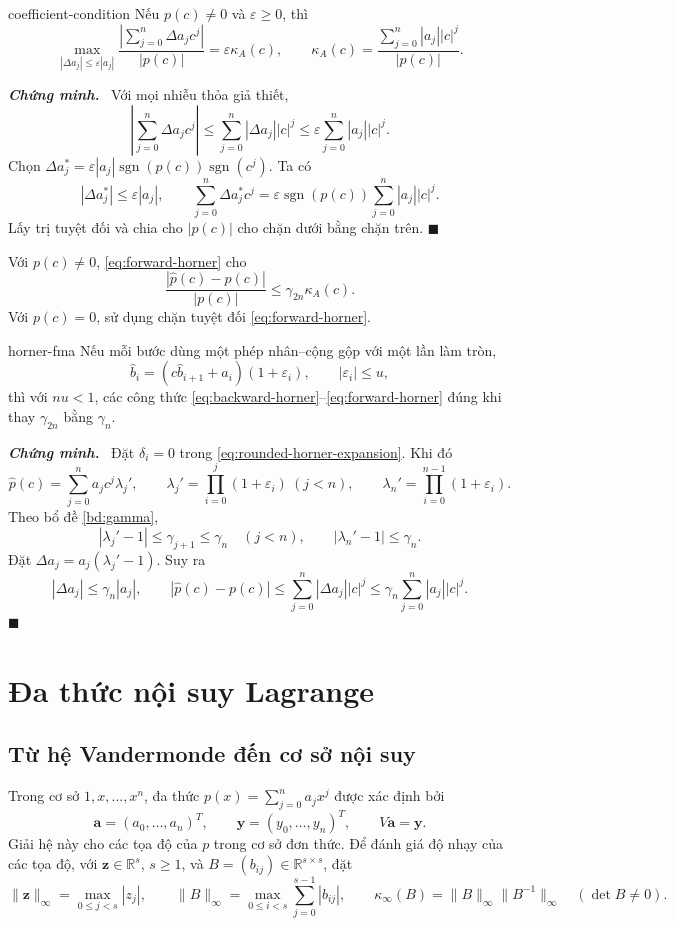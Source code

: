 \documentclass[12pt,a4paper,oneside]{book}
\numberwithin{algorithm}{chapter}
\theoremstyle{definition}
\newenvironment{chungminh}{\par\medskip\noindent\textbf{\textit{\color{mainblue}Chứng minh.}}\ }{\hfill$\blacksquare$\par\medskip}
\newcommand{\R}{\mathbb{R}}
\begin{document}
\begin{menhde}{}{coefficient-condition}
Nếu $p(c)\ne0$ và $\varepsilon\geq0$, thì
\[
 \max_{|\Delta a_j|\leq\varepsilon|a_j|}
 \frac{\left|\sum_{j=0}^{n}\Delta a_jc^j\right|}{|p(c)|}
 =\varepsilon\kappa_A(c),\qquad
 \kappa_A(c)=\frac{\sum_{j=0}^{n}|a_j||c|^j}{|p(c)|}.
\]
\end{menhde}
\begin{chungminh}
Với mọi nhiễu thỏa giả thiết,
\[
 \left|\sum_{j=0}^{n}\Delta a_jc^j\right|
 \leq\sum_{j=0}^{n}|\Delta a_j||c|^j
 \leq\varepsilon\sum_{j=0}^{n}|a_j||c|^j.
\]
Chọn $\Delta a_j^*=\varepsilon|a_j|\operatorname{sgn}(p(c))\operatorname{sgn}(c^j)$. Ta có
\[
 |\Delta a_j^*|\leq\varepsilon|a_j|,\qquad
 \sum_{j=0}^{n}\Delta a_j^*c^j
 =\varepsilon\operatorname{sgn}(p(c))\sum_{j=0}^{n}|a_j||c|^j.
\]
Lấy trị tuyệt đối và chia cho $|p(c)|$ cho chặn dưới bằng chặn trên.
\end{chungminh}

Với $p(c)\ne0$, \eqref{eq:forward-horner} cho
\[
 \frac{|\widehat p(c)-p(c)|}{|p(c)|}\leq\gamma_{2n}\kappa_A(c).
\]
Với $p(c)=0$, sử dụng chặn tuyệt đối \eqref{eq:forward-horner}.

\begin{hequa}{}{horner-fma}
Nếu mỗi bước dùng một phép nhân--cộng gộp với một lần làm tròn,
\[
 \widehat b_i=(c\widehat b_{i+1}+a_i)(1+\varepsilon_i),\qquad
 |\varepsilon_i|\leq u,
\]
thì với $nu<1$, các công thức \eqref{eq:backward-horner}--\eqref{eq:forward-horner} đúng khi thay $\gamma_{2n}$ bằng $\gamma_n$.
\end{hequa}
\begin{chungminh}
Đặt $\delta_i=0$ trong \eqref{eq:rounded-horner-expansion}. Khi đó
\[
 \widehat p(c)=\sum_{j=0}^{n}a_jc^j\lambda_j',\qquad
 \lambda_j'=\prod_{i=0}^{j}(1+\varepsilon_i)\ (j<n),\qquad
 \lambda_n'=\prod_{i=0}^{n-1}(1+\varepsilon_i).
\]
Theo bổ đề \ref{bd:gamma},
\[
 |\lambda_j'-1|\leq\gamma_{j+1}\leq\gamma_n\quad(j<n),
 \qquad|\lambda_n'-1|\leq\gamma_n.
\]
Đặt $\Delta a_j=a_j(\lambda_j'-1)$. Suy ra
\[
 |\Delta a_j|\leq\gamma_n|a_j|,\qquad
 |\widehat p(c)-p(c)|
 \leq\sum_{j=0}^{n}|\Delta a_j||c|^j
 \leq\gamma_n\sum_{j=0}^{n}|a_j||c|^j.
\]
\end{chungminh}

\section{Đa thức nội suy Lagrange}
\subsection{Từ hệ Vandermonde đến cơ sở nội suy}
Trong cơ sở $1,x,\ldots,x^n$, đa thức $p(x)=\sum_{j=0}^n a_jx^j$ được xác định bởi
\[
 \mathbf a=(a_0,\ldots,a_n)^T,\qquad
 \mathbf y=(y_0,\ldots,y_n)^T,\qquad V\mathbf a=\mathbf y.
\]
Giải hệ này cho các tọa độ của $p$ trong cơ sở đơn thức. Để đánh giá độ nhạy của các tọa độ, với $\mathbf z\in\R^s$, $s\geq1$, và $B=(b_{ij})\in\R^{s\times s}$, đặt
\[
 \|\mathbf z\|_\infty=\max_{0\leq j<s}|z_j|,\qquad
 \|B\|_\infty=\max_{0\leq i<s}\sum_{j=0}^{s-1}|b_{ij}|,
 \qquad \kappa_\infty(B)=\|B\|_\infty\|B^{-1}\|_\infty
 \quad(\det B\ne0).
\]
\end{document}
